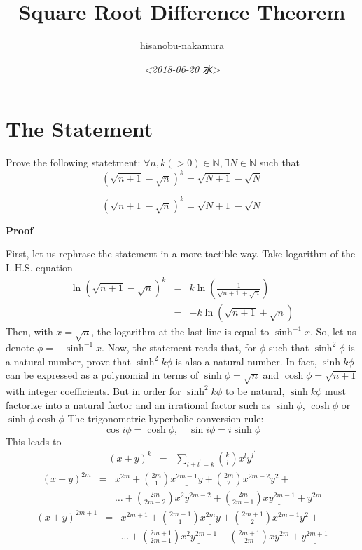 \documentclass{article}
\author{hisanobu-nakamura}
\date{\textit{<2018-06-20 水>}}
\title{Square Root Difference Theorem}
\begin{document}
\maketitle


\section{The Statement}
\label{sec-1}
Prove the following statetment:
$\forall n, k (>0) \in \mathbb{N}, \exists N \in \mathbb{N}$ such that
\begin{equation}
  \label{eq:main}
  (\sqrt{n+1} - \sqrt{n})^k = \sqrt{N+1} -\sqrt{N}
\end{equation}

\begin{equation}
  \label{eq:main}
  (\sqrt{n+1} - \sqrt{n})^k = \sqrt{N+1} -\sqrt{N}
\end{equation}


\textbf{Proof}

First, let us rephrase the statement in a more tactible way. Take logarithm of the L.H.S.
equation
\begin{eqnarray*}
\ln (\sqrt{n + 1} - \sqrt{n})^k &=& k \ln (\frac{1}{\sqrt{n + 1} + \sqrt{n}}) \\
&=& - k \ln (\sqrt{n + 1} + \sqrt{n})
\end{eqnarray*}
Then, with $x = \sqrt{n}$, the logarithm at the last line is equal to $\sinh^{-1}{x}$. So, let us denote $\phi = - \sinh^{-1}{x}$.
Now, the statement reads that, for $\phi$ such that $\sinh^2 \phi$ is a natural number, prove that $\sinh^2 k \phi$ is also a natural number.
In fact, $\sinh k \phi$ can be expressed as a polynomial in terms of $\sinh{\phi} = \sqrt{n}$ and $\cosh{\phi} = \sqrt{n + 1}$ with integer coefficients. 
But in order for $\sinh^2 k \phi$ to be natural, $\sinh k \phi$ must factorize into a natural factor and an irrational factor such as $\sinh{\phi}$, $\cosh{\phi}$ or $\sinh{\phi}\cosh{\phi}$
The trigonometric-hyperbolic conversion rule:
\begin{equation}
  \label{eq:trig-hype}
  \cos{i \phi} = \cosh{\phi}, \quad \sin{i \phi} = i \sinh{\phi} 
\end{equation}
This leads to
\begin{eqnarray}
  \label{eq:binomial}
  (x + y)^{k} &=& \sum_{l + l^{\prime} = k} \binom{k}{l} x^l y^{l^{\prime}}
\end{eqnarray}
\begin{eqnarray}
  \label{eq:binomial-even}
  (x + y)^{2m} &=& x ^{2m} + \binom{2m}{1} \underline{x^{2m-1}y} + \binom{2m}{2} x^{2m-2}y^2 + \nonumber \\
               && \dots + \binom{2m}{2m - 2} x^2 y^{2m-2} + \binom{2m}{2m - 1} \underline{x y^{2m-1}} + y^{2m}
\end{eqnarray}
\begin{eqnarray}
  \label{eq:binomial-odd}
  (x + y)^{2m+1} &=& x ^{2m+1} + \binom{2m+1}{1} \underline{x^{2m}y} + \binom{2m+1}{2} x^{2m-1}y^2 + \nonumber \\
  && \dots + \binom{2m + 1}{2m - 1} \underline{x^2 y^{2m-1}} + \binom{2m + 1}{2m} x y^{2m} + \underline{y^{2m+1}}
\end{eqnarray}
\end{document}
